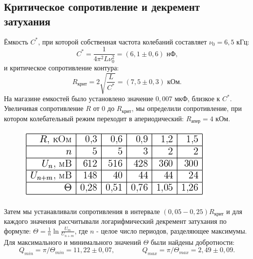\subsection*{Критическое сопротивление и декремент затухания}
Ёмкость $C^*$, при которой собственная частота колебаний составляет $\nu_0 = 6,5$ кГц:
\[ C^* = \frac{1}{4 \pi^2 L \nu_0^2} = (6,1 \pm 0,6) \text{ нФ,} \]
и критическое сопротивление контура:
\[ R_{\text{крит}} = 2\sqrt{\frac{L}{C^*}} = (7,5 \pm 0,3) \text{ кОм.} \]
На магазине емкостей было установлено значение $0,007$ мкФ, близкое к $C^*$. Увеличивая сопротивление $R$ от $0$ до $R_{\text{крит}}$, мы определили сопротивление, при котором колебательный режим переходит в апериодический: $R_{\text{апер}} = 4$ кОм.
\begin{figure}
\includegraphics[scale=3]{tab1.png}
\vspace{-2cm}
\end{figure}
Затем мы устанавливали сопротивления в интервале $(0,05 - 0,25)R_{\text{крит}}$ и для каждого значения рассчитывали логарифмический декремент затухания по формуле: $\Theta = \frac{1}{n}\ln \frac{U_{m}}{U_{n + m}}$, где $n$ - целое число периодов, разделяющее максимумы.
\n\n
Для максимального и минимального значений $\Theta$ были найдены добротности:
\[ Q_{min} = \pi / \Theta_{min} = 11,22 \pm 0,07, \qquad \qquad Q_{max} = \pi / \Theta_{max} = 2,49 \pm 0,09. \]
